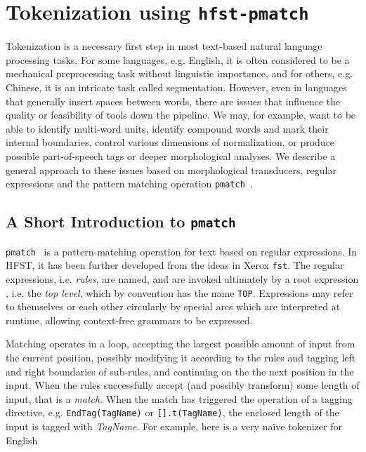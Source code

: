 \documentclass{llncs}
\begin{document}
\section{Tokenization using {\tt hfst-pmatch}}\label{sec:tokenization}
Tokenization is a necessary first step in most text-based natural language processing tasks. For some
languages, e.g. English, it is often considered to be a mechanical
preprocessing task without linguistic importance, and for others, e.g. Chinese,
it is an intricate task called segmentation. However, even in languages that generally insert spaces between words, there
are issues that influence the quality or feasibility of tools down the
pipeline. We may, for example, want to be able to identify multi-word units,
identify compound words and mark their internal boundaries, control various
dimensions of normalization, or produce possible part-of-speech tags or
deeper morphological analyses. We describe a general approach to these issues based on morphological
transducers, regular expressions and the pattern matching operation
\verb+pmatch+~\cite{karttunen/2011}.

\subsection{A Short Introduction to {\tt pmatch}}

\verb+pmatch+~\cite{hfst-pmatch} is a pattern-matching operation for text based
on regular expressions. In HFST, it has been further developed from the ideas in Xerox
\verb+fst+. The regular expressions, i.e. \emph{rules}, are named, and are
invoked ultimately by a root expression , i.e. the \emph{top level}, which by convention
has the name \verb+TOP+. Expressions may refer to themselves or each other
circularly by special arcs which are interpreted at runtime, allowing
context-free grammars to be expressed.

Matching operates in a loop, accepting the largest
possible amount of input from the current position, possibly modifying it
according to the rules and tagging left and right boundaries of sub-rules, and
continuing on the the next position in the input. 
When the rules successfully accept (and possibly transform) some length of
input, that is a \emph{match}.
When the match has triggered the operation of a tagging directive, e.g. 
\verb+EndTag(TagName)+ or \verb+[].t(TagName)+, the enclosed length of the input is tagged with \emph{TagName}. 
For example, here is a very naïve tokenizer for English
\end{document}
